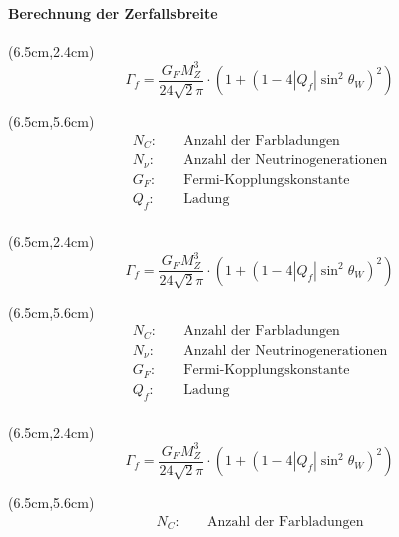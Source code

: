 \begin{iframe}
	\framesubtitle{Berechnung der Zerfallsbreite}
	 {
	\begin{textblock*}{5cm}(6.5cm,2.4cm) %
	\begin{equation*}
		\Gamma_f=\frac{G_F M_Z^3}{24\sqrt{2}\pi}\cdot (1+(1-4|Q_f|\sin^2{\theta_W})^2)
	\end{equation*}
	\end{textblock*}
	\begin{textblock*}{5cm}(6.5cm,5.6cm)
		{\small
		\begin{align*}
			N_C:& \quad \text{Anzahl der Farbladungen}\\
			N_\nu:& \quad \text{Anzahl der Neutrinogenerationen}\\
			G_F:& \quad \text{Fermi-Kopplungskonstante}\\
			Q_f:& \quad \text{Ladung} \\
		\end{align*} }
	\end{textblock*}
	}
	 {
	\begin{textblock*}{5cm}(6.5cm,2.4cm) %
	\begin{equation*}
		\Gamma_f=\frac{G_F M_Z^3}{24\sqrt{2}\pi}\cdot (1+(1-4|Q_f|\sin^2{\theta_W})^2)
	\end{equation*}
	\end{textblock*}
	\begin{textblock*}{5cm}(6.5cm,5.6cm)
		{\small
		\begin{align*}
			N_C:& \quad \text{Anzahl der Farbladungen}\\
			N_\nu:& \quad \text{Anzahl der Neutrinogenerationen}\\
			G_F:& \quad \text{Fermi-Kopplungskonstante}\\
			Q_f:& \quad \text{Ladung} \\
		\end{align*} }
	\end{textblock*}
	}
	 {
	\begin{textblock*}{5cm}(6.5cm,2.4cm) %
	\begin{equation*}
		\Gamma_f=\frac{G_F M_Z^3}{24\sqrt{2}\pi}\cdot (1+(1-4|Q_f|\sin^2{\theta_W})^2)
	\end{equation*}
	\end{textblock*}
	\begin{textblock*}{5cm}(6.5cm,5.6cm)
		{\small
		\begin{align*}
			N_C:& \quad \text{Anzahl der Farbladungen}\\

\end{align*}}
\end{textblock*}}
\end{iframe}
